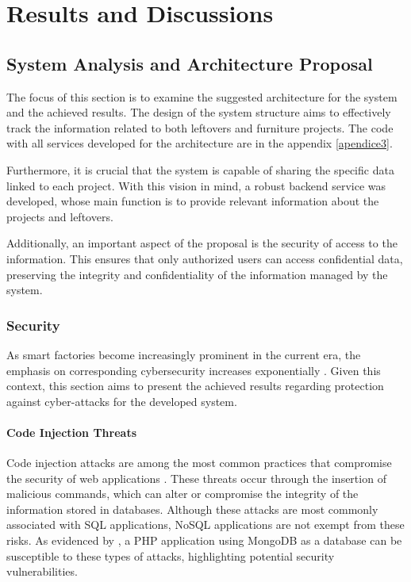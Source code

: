 \chapter{Results and Discussions}\label{cap:results}


 \section{System Analysis and Architecture Proposal}\label{section:systemArch}

The focus of this section is to examine the suggested architecture for the system and the achieved results. The design of the system structure aims to effectively track the information related to both leftovers and furniture projects. The code with all services developed for the architecture are in the appendix \ref{apendice3}.

Furthermore, it is crucial that the system is capable of sharing the specific data linked to each project. With this vision in mind, a robust backend service was developed, whose main function is to provide relevant information about the projects and leftovers.

Additionally, an important aspect of the proposal is the security of access to the information. This ensures that only authorized users can access confidential data, preserving the integrity and confidentiality of the information managed by the system.

\subsection{Security}
As smart factories become increasingly prominent in the current era, the emphasis on corresponding cybersecurity increases exponentially \cite{Ervural2018}. Given this context, this section aims to present the achieved results regarding protection against cyber-attacks for the developed system.


\subsubsection{Code Injection Threats}

Code injection attacks are among the most common practices that compromise the security of web applications \cite{Ray10.1145/2103656.2103678}. These threats occur through the insertion of malicious commands, which can alter or compromise the integrity of the information stored in databases. Although these attacks are most commonly associated with SQL applications, NoSQL applications are not exempt from these risks. As evidenced by \textcite{ron2015no}, a PHP application using MongoDB as a database can be susceptible to these types of attacks, highlighting potential security vulnerabilities.

